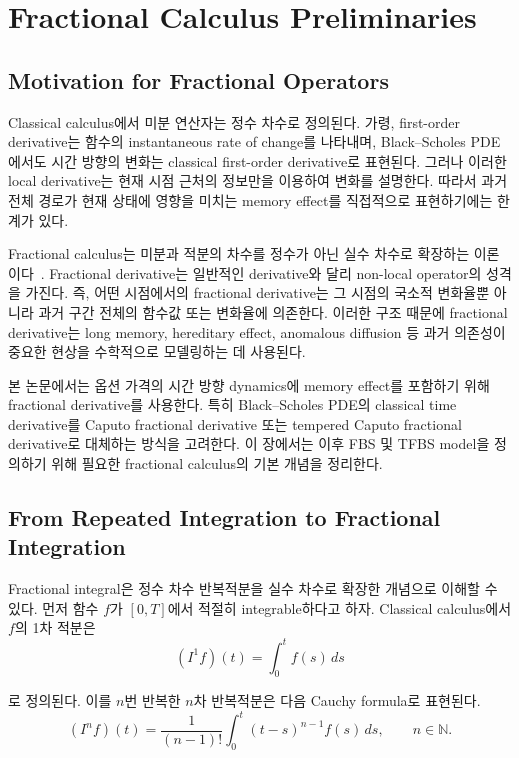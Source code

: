 \documentclass[11pt,a4paper]{report}
\begin{document}
\chapter{Fractional Calculus Preliminaries}

\section{Motivation for Fractional Operators}

Classical calculus에서 미분 연산자는 정수 차수로 정의된다. 가령, first-order derivative는 함수의 instantaneous rate of change를 나타내며, Black--Scholes PDE에서도 시간 방향의 변화는 classical first-order derivative로 표현된다. 그러나 이러한 local derivative는 현재 시점 근처의 정보만을 이용하여 변화를 설명한다. 따라서 과거 전체 경로가 현재 상태에 영향을 미치는 memory effect를 직접적으로 표현하기에는 한계가 있다.

Fractional calculus는 미분과 적분의 차수를 정수가 아닌 실수 차수로 확장하는 이론이다~\cite{Podlubny1999}. Fractional derivative는 일반적인 derivative와 달리 non-local operator의 성격을 가진다. 즉, 어떤 시점에서의 fractional derivative는 그 시점의 국소적 변화율뿐 아니라 과거 구간 전체의 함수값 또는 변화율에 의존한다. 이러한 구조 때문에 fractional derivative는 long memory, hereditary effect, anomalous diffusion 등 과거 의존성이 중요한 현상을 수학적으로 모델링하는 데 사용된다.

본 논문에서는 옵션 가격의 시간 방향 dynamics에 memory effect를 포함하기 위해 fractional derivative를 사용한다. 특히 Black--Scholes PDE의 classical time derivative를 Caputo fractional derivative 또는 tempered Caputo fractional derivative로 대체하는 방식을 고려한다. 이 장에서는 이후 FBS 및 TFBS model을 정의하기 위해 필요한 fractional calculus의 기본 개념을 정리한다.

\section{From Repeated Integration to Fractional Integration}

Fractional integral은 정수 차수 반복적분을 실수 차수로 확장한 개념으로 이해할 수 있다. 먼저 함수 $f$가 $[0,T]$에서 적절히 integrable하다고 하자. Classical calculus에서 $f$의 1차 적분은
\[
(I^1 f)(t)
=
\int_0^t f(s)\,ds
\]

로 정의된다. 이를 $n$번 반복한 $n$차 반복적분은 다음 Cauchy formula로 표현된다.
\[
(I^n f)(t)
=
\frac{1}{(n-1)!}
\int_0^t
(t-s)^{n-1}f(s)\,ds,
\qquad n\in\mathbb{N}.
\]
\end{document}
